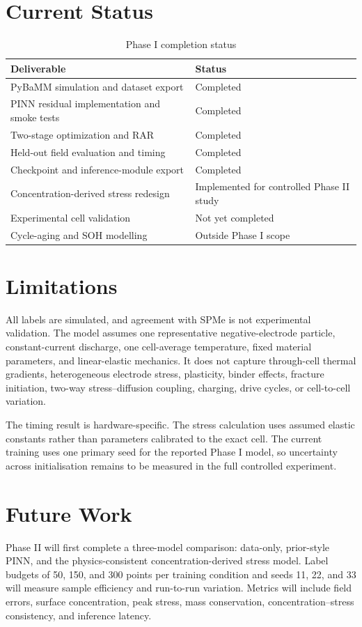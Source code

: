 \documentclass[14pt,a4paper,oneside]{extreport}
\begin{document}
\section{Current Status}
\begin{table}[htbp]
\centering
\caption{Phase I completion status}
\small
\begin{tabularx}{\textwidth}{p{}X}
\toprule
Deliverable & Status\\
\midrule
PyBaMM simulation and dataset export & Completed\\
PINN residual implementation and smoke tests & Completed\\
Two-stage optimization and RAR & Completed\\
Held-out field evaluation and timing & Completed\\
Checkpoint and inference-module export & Completed\\
Concentration-derived stress redesign & Implemented for controlled Phase II study\\
Experimental cell validation & Not yet completed\\
Cycle-aging and SOH modelling & Outside Phase I scope\\
\bottomrule
\end{tabularx}
\end{table}

\section{Limitations}
All labels are simulated, and agreement with SPMe is not experimental validation. The model assumes one representative negative-electrode particle, constant-current discharge, one cell-average temperature, fixed material parameters, and linear-elastic mechanics. It does not capture through-cell thermal gradients, heterogeneous electrode stress, plasticity, binder effects, fracture initiation, two-way stress--diffusion coupling, charging, drive cycles, or cell-to-cell variation.

The timing result is hardware-specific. The stress calculation uses assumed elastic constants rather than parameters calibrated to the exact cell. The current training uses one primary seed for the reported Phase I model, so uncertainty across initialisation remains to be measured in the full controlled experiment.

\section{Future Work}
Phase II will first complete a three-model comparison: data-only, prior-style PINN, and the physics-consistent concentration-derived stress model. Label budgets of 50, 150, and 300 points per training condition and seeds 11, 22, and 33 will measure sample efficiency and run-to-run variation. Metrics will include field errors, surface concentration, peak stress, mass conservation, concentration--stress consistency, and inference latency.
\end{document}
